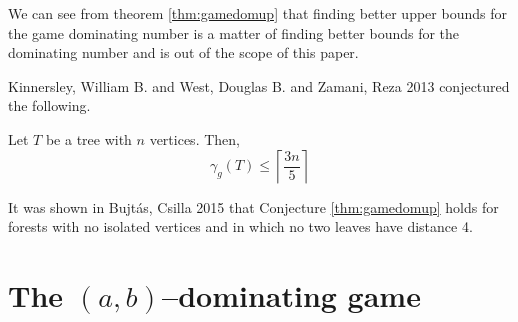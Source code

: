 We can see from theorem \ref{thm:gamedomup} that finding better upper bounds for the game dominating number is a matter of finding better bounds for the dominating number and is out of the scope of this paper. 


Kinnersley, William B. and West, Douglas B. and Zamani, Reza 2013 \cite{KiWeZa2013} conjectured the following. 
\begin{conjecture} \label{thm:treedomup}
    Let $T$ be a tree with $n$ vertices. Then,    
    \[ \gamma_g(T) \leq \left\lceil \frac{3n}{5} \right\rceil\]
\end{conjecture}
 It was shown in Bujt\'{a}s, Csilla 2015 that Conjecture \ref{thm:gamedomup} holds for forests with no isolated vertices and in which no two leaves have distance 4.
%
%    
%        
%    
%   
%       

\section{The $(a,b)$--dominating game}

